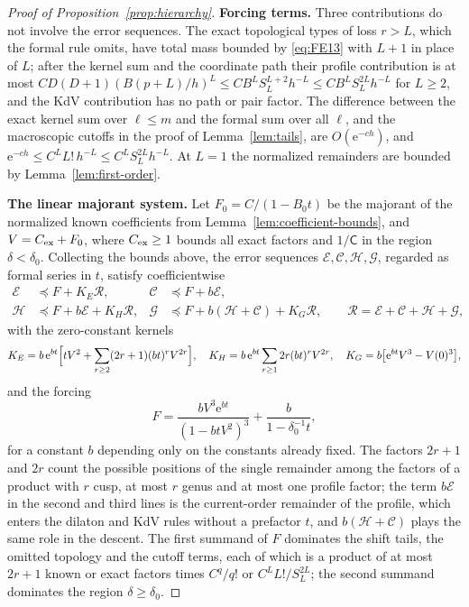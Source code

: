 \begin{proof}[Proof of Proposition~\ref{prop:hierarchy}]
\textbf{Forcing terms.} Three contributions do not involve the error
sequences. The exact topological types of loss $r>L$, which the formal
rule omits, have total mass bounded by \eqref{eq:FE13} with $L+1$ in
place of $L$; after the kernel sum and the coordinate path their profile
contribution is at most
$CD(D+1)(B(p+L)/h)^{L}\le CB^LS_L^{L+2}h^{-L}\le CB^LS_L^{2L}h^{-L}$ for
$L\ge2$, and the KdV contribution has no path or pair factor. The
difference between the exact kernel sum over $\ell\le m$ and the formal
sum over all $\ell$, and the macroscopic cutoffs in the proof of Lemma~\ref{lem:tails}, are
$O(\mathrm{e}^{-ch})$, and
$\mathrm{e}^{-ch}\le C^LL!\,h^{-L}\le C^LS_L^{2L}h^{-L}$. At $L=1$ the
normalized remainders are bounded by Lemma~\ref{lem:first-order}.

\textbf{The linear majorant system.} Let $F_0=C/(1-B_0t)$ be the majorant
of the normalized known coefficients from Lemma~\ref{lem:coefficient-bounds}, and
$V=C_{\rm ex}+F_0$, where $C_{\rm ex}\ge1$ bounds all exact factors and
$1/\mathsf C$ in the region $\delta<\delta_0$. Collecting the bounds
above, the error sequences $\mathscr E,\mathscr C,\mathscr H,\mathscr G$,
regarded as formal series in $t$, satisfy coefficientwise
\begin{equation}
\begin{aligned}
 \mathscr E&\preceq F+K_E\mathscr R,&
 \mathscr C&\preceq F+b\mathscr E,\\
 \mathscr H&\preceq F+b\mathscr E+K_H\mathscr R,&
 \mathscr G&\preceq F+b(\mathscr H+\mathscr C)+K_G\mathscr R,
 \qquad \mathscr R=\mathscr E+\mathscr C+\mathscr H+\mathscr G,
\end{aligned}
\label{eq:FE-error-system}
\end{equation}
with the zero-constant kernels
\[
 K_E=b\,\mathrm{e}^{bt}\Bigl[tV^2+\sum_{r\ge2}(2r+1)(bt)^rV^{2r}\Bigr],\quad
 K_H=b\,\mathrm{e}^{bt}\sum_{r\ge1}2r(bt)^rV^{2r},\quad
 K_G=b\bigl[\mathrm{e}^{bt}V^3-V(0)^3\bigr],
\]
and the forcing
\[
 F=\frac{bV^3\mathrm{e}^{bt}}{(1-btV^2)^3}+\frac{b}{1-\delta_0^{-1}t},
\]
for a constant $b$ depending only on the constants already fixed. The
factors $2r+1$ and $2r$ count the possible positions of the single
remainder among the factors of a product with $r$ cusp, at most $r$ genus
and at most one profile factor; the term $b\mathscr E$ in the second and
third lines is the current-order remainder of the profile, which enters
the dilaton and KdV rules without a prefactor $t$, and $b(\mathscr H+\mathscr C)$
plays the same role in the descent. The first summand of $F$ dominates
the shift tails, the omitted topology and the cutoff terms, each of which
is a product of at most $2r+1$ known or exact factors times $C^q/q!$ or
$C^LL!/S_L^{2L}$; the second summand dominates the region
$\delta\ge\delta_0$.


\end{proof}
